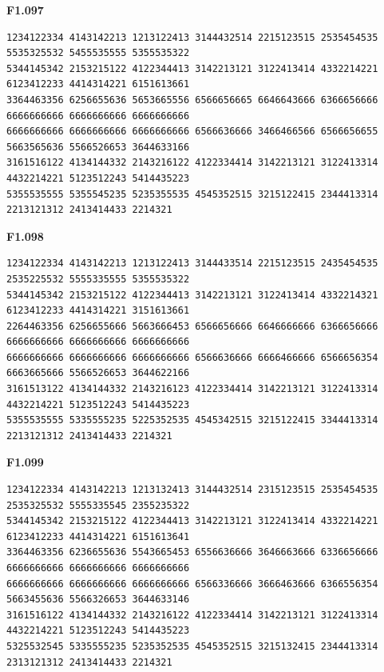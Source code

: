 \noindent\begin{minipage}{\linewidth}\textbf{F1.097}
\begin{lstlisting}
1234122334 4143142213 1213122413 3144432514 2215123515 2535454535 5535325532 5455535555 5355535322
5344145342 2153215122 4122344413 3142213121 3122413414 4332214221 6123412233 4414314221 6151613661
3364463356 6256655636 5653665556 6566656665 6646643666 6366656666 6666666666 6666666666 6666666666
6666666666 6666666666 6666666666 6566636666 3466466566 6566656655 5663565636 5566526653 3644633166
3161516122 4134144332 2143216122 4122334414 3142213121 3122413314 4432214221 5123512243 5414435223
5355535555 5355545235 5235355535 4545352515 3215122415 2344413314 2213121312 2413414433 2214321
\end{lstlisting}
\end{minipage}\par\smallskip

\noindent\begin{minipage}{\linewidth}\textbf{F1.098}
\begin{lstlisting}
1234122334 4143142213 1213122413 3144433514 2215123515 2435454535 2535225532 5555335555 5355535322
5344145342 2153215122 4122344413 3142213121 3122413414 4332214321 6123412233 4414314221 3151613661
2264463356 6256655666 5663666453 6566656666 6646666666 6366656666 6666666666 6666666666 6666666666
6666666666 6666666666 6666666666 6566636666 6666466666 6566656354 6663665666 5566526653 3644622166
3161513122 4134144332 2143216123 4122334414 3142213121 3122413314 4432214221 5123512243 5414435223
5355535555 5335555235 5225352535 4545342515 3215122415 3344413314 2213121312 2413414433 2214321
\end{lstlisting}
\end{minipage}\par\smallskip

\noindent\begin{minipage}{\linewidth}\textbf{F1.099}
\begin{lstlisting}
1234122334 4143142213 1213132413 3144432514 2315123515 2535454535 2535325532 5555335545 2355235322
5344145342 2153215122 4122344413 3142213121 3122413414 4332214221 6123412233 4414314221 6151613641
3364463356 6236655636 5543665453 6556636666 3646663666 6336656666 6666666666 6666666666 6666666666
6666666666 6666666666 6666666666 6566336666 3666463666 6366556354 5663455636 5566326653 3644633146
3161516122 4134144332 2143216122 4122334414 3142213121 3122413314 4432214221 5123512243 5414435223
5325532545 5335555235 5235352535 4545352515 3215132415 2344413314 2313121312 2413414433 2214321
\end{lstlisting}
\end{minipage}\par\smallskip

